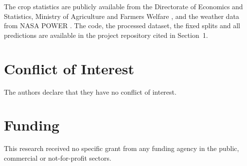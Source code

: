 The crop statistics are publicly available from the Directorate of Economics and Statistics,
Ministry of Agriculture and Farmers Welfare \cite{desapy}, and the weather data from NASA POWER
\cite{nasapower}. The code, the processed dataset, the fixed splits and all predictions are
available in the project repository cited in Section~1.

\section*{Conflict of Interest}

The authors declare that they have no conflict of interest.

\section*{Funding}

This research received no specific grant from any funding agency in the public, commercial or
not-for-profit sectors.
